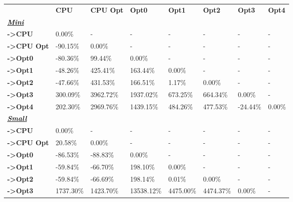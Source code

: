 \begin{table}[H]
    \centering
    \begin{tabular}{llllllll}
    \rowcolor[HTML]{DAE8FC} \ &  \textbf{CPU} &  \textbf{CPU Opt} &  \textbf{Opt0} &  \textbf{Opt1} &  \textbf{Opt2} &  \textbf{Opt3} &  \textbf{Opt4} \\
    \cellcolor[HTML]{DAE8FC} \textbf{\textbf{{\emph{{\underline{{Mini}}}}}}} &  &  &  &  &  &  &  \\
    \rowcolor[HTML]{EFEFEF} \cellcolor[HTML]{DAE8FC} \textbf{->CPU} & 0.00\% & - & - & - & - & - & - \\
    \cellcolor[HTML]{DAE8FC} \textbf{->CPU Opt} & -90.15\% & 0.00\% & - & - & - & - & - \\
    \rowcolor[HTML]{EFEFEF} \cellcolor[HTML]{DAE8FC} \textbf{->Opt0} & -80.36\% & 99.44\% & 0.00\% & - & - & - & - \\
    \cellcolor[HTML]{DAE8FC} \textbf{->Opt1} & -48.26\% & 425.41\% & 163.44\% & 0.00\% & - & - & - \\
    \rowcolor[HTML]{EFEFEF} \cellcolor[HTML]{DAE8FC} \textbf{->Opt2} & -47.66\% & 431.53\% & 166.51\% & 1.17\% & 0.00\% & - & - \\
    \cellcolor[HTML]{DAE8FC} \textbf{->Opt3} & 300.09\% & 3962.72\% & 1937.02\% & 673.25\% & 664.34\% & 	0.00\% & - \\
    \rowcolor[HTML]{EFEFEF} \cellcolor[HTML]{DAE8FC} \textbf{->Opt4} & 202.30\% & 2969.76\% & 1439.15\% & 484.26\% & 477.53\% & 	-24.44\% & 	0.00\% \\
    \cellcolor[HTML]{DAE8FC} \textbf{\textbf{{\emph{{\underline{{Small}}}}}}} &  &  &  &  &  &  &  \\
    \rowcolor[HTML]{EFEFEF} \cellcolor[HTML]{DAE8FC} \textbf{->CPU} & 0.00\% & - & - & - & - & - & - \\
    \cellcolor[HTML]{DAE8FC} \textbf{->CPU Opt} & 20.58\% & 0.00\% & - & - & - & - & - \\
    \rowcolor[HTML]{EFEFEF} \cellcolor[HTML]{DAE8FC} \textbf{->Opt0} & -86.53\% & -88.83\% & 0.00\% & - & - & - & - \\
    \cellcolor[HTML]{DAE8FC} \textbf{->Opt1} & -59.84\% & -66.70\% & 198.10\% & 0.00\% & - & - & - \\
    \rowcolor[HTML]{EFEFEF} \cellcolor[HTML]{DAE8FC} \textbf{->Opt2} & -59.84\% & -66.69\% & 198.14\% & 0.01\% & 0.00\% & - & - \\
    \cellcolor[HTML]{DAE8FC} \textbf{->Opt3} & 1737.30\% & 1423.70\% & 13538.12\% & 4475.00\% & 4474.37\% & 	0.00\% & - \\

\end{tabular}
\end{table}
